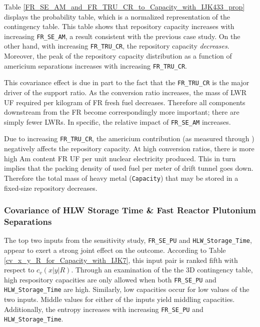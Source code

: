 

Table \ref{FR_SE_AM_and_FR_TRU_CR_to_Capacity_with_IJK433_prop} displays the 
probability table, which is a normalized representation of the contingency table.
This table shows that repository capacity increases with increasing \texttt{FR\_SE\_AM}, 
a result consistent
with the previous case study.  On the other hand, with increasing \texttt{FR\_TRU\_CR}, 
the repository capacity \emph{decreases}.  Moreover, the
peak of the repository capacity distribution as a function
of americium separations increases with increasing \texttt{FR\_TRU\_CR}.

This covariance effect is due in part to the fact that the \texttt{FR\_TRU\_CR} is the 
major driver of the support ratio.  As the conversion ratio
increases, the mass of LWR UF required per kilogram of FR fresh fuel decreases.  
Therefore all components downstream from the FR become correspondingly more important;
there are simply fewer LWRs.  In specific, the relative impact of \texttt{FR\_SE\_AM} increases.

Due to increasing \texttt{FR\_TRU\_CR}, the americium contribution (as measured 
through ) negatively affects the repository capacity.  At high 
conversion ratios, there is more high Am content FR UF per unit nuclear 
electricity produced.  This in turn implies that the
packing density of used fuel per meter of drift tunnel goes down.  Therefore 
the total mass of heavy metal (\texttt{Capacity}) that may be stored in a
fixed-size repository decreases.


\subsubsection{Covariance of HLW Storage Time \& Fast Reactor Plutonium Separations}
\label{cts_sec:hlw_pu_covariance}

The top two inputs from the sensitivity study, \texttt{FR\_SE\_PU} and 
\texttt{HLW\_Storage\_Time}, appear to exert a strong joint effect on the 
outcome.  According to Table \ref{cv_x_y_R_for_Capacity_with_IJK7}, this 
input pair is ranked fifth with respect to $c_v(x|y|R)$.
Through an examination of the the 3D contingency table, high respository 
capacities are only allowed when both \texttt{FR\_SE\_PU} and
\texttt{HLW\_Storage\_Time} are high.  Similarly, low capacities occur 
for low values of the two inputs.  Middle values for either of the
inputs yield middling capacities.  Additionally, the entropy increases 
with increasing \texttt{FR\_SE\_PU} and \texttt{HLW\_Storage\_Time}.

